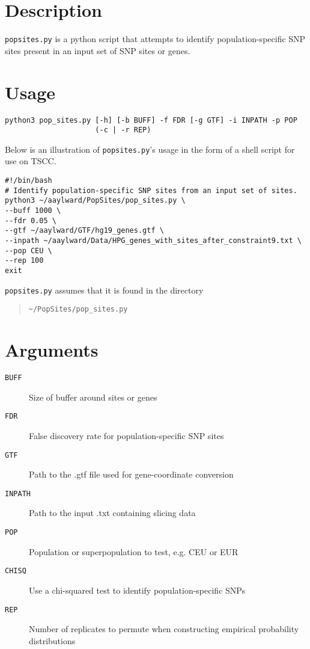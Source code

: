 \documentclass[12pt]{scrartcl}
\begin{document}
\maketitle
\section{Description}
\texttt{pop{\textunderscore}sites.py} is a python script that attempts to  identify population-specific SNP sites present in an input set of SNP sites or genes. 
\section{Usage}
\begin{verbatim}
python3 pop_sites.py [-h] [-b BUFF] -f FDR [-g GTF] -i INPATH -p POP
                     (-c | -r REP)
\end{verbatim}
Below is an illustration of \texttt{pop{\textunderscore}sites.py}'s usage in the form of a shell script for use on TSCC.
\begin{verbatim}
#!/bin/bash
# Identify population-specific SNP sites from an input set of sites.
python3 ~/aaylward/PopSites/pop_sites.py \
--buff 1000 \
--fdr 0.05 \
--gtf ~/aaylward/GTF/hg19_genes.gtf \
--inpath ~/aaylward/Data/HPG_genes_with_sites_after_constraint9.txt \
--pop CEU \
--rep 100
exit
\end{verbatim}
\texttt{pop{\textunderscore}sites.py} assumes that it is found in the directory
\begin{quote}
\begin{verbatim}
~/PopSites/pop_sites.py
\end{verbatim}
\end{quote}

\section{Arguments}
\begin{description}
\item[\texttt{BUFF}] Size of buffer around sites or genes
\item[\texttt{FDR}] False discovery rate for population-specific SNP sites
\item[\texttt{GTF}] Path to the .gtf file used for gene-coordinate conversion
\item[\texttt{INPATH}] Path to the input .txt containing slicing data
\item[\texttt{POP}] Population or superpopulation to test, e.g. CEU or EUR
\item[\texttt{CHISQ}] Use a chi-squared test to identify population-specific SNPs
\item[\texttt{REP}] Number of replicates to permute when constructing empirical probability distributions
\end{description}
\end{document}
